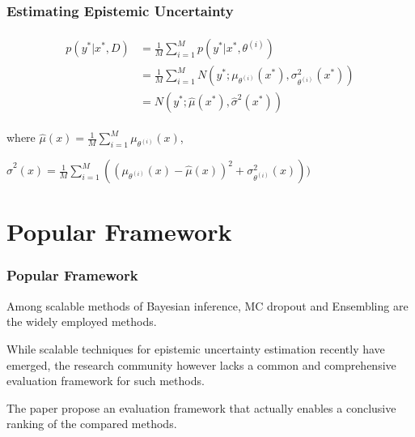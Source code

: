 \documentclass{beamer}
\begin{document}
\begin{frame}
\frametitle{Estimating Epistemic Uncertainty}

\begin{align}
\begin{split}
 p(y^*|x^*, D) &= \frac{1}{M} \sum_{i=1}^{M} p(y^*| x^*, \theta^{(i)})
\\
  &= \frac{1}{M} \sum_{i=1}^{M} N(y^*; \mu_{\theta^{(i)}} (x^*), \sigma_{\theta^{(i)}}^2 (x^*)) 
\\
  &= N(y^*; \hat{\mu}(x^*), \hat{\sigma}^2 (x^*))
\end{split}
\end{align}

where
$\hat{\mu}(x) = \frac{1}{M} \sum_{i=1}^{M} \mu_{\theta^{(i)}} (x) $, 

\vspace{0.3cm}

$\hat{\sigma}^2 (x) = \frac{1}{M} \sum_{i=1}^{M} ((\mu_{\theta^{(i)}} (x) -  \hat{\mu}(x) )^2 + \sigma_{\theta^{(i)}}^2 (x)) )$

\end{frame}



\section{Popular Framework}
\begin{frame}
\frametitle{Popular Framework}

\hspace{0.3cm} Among scalable methods of Bayesian inference, MC dropout and Ensembling are the widely employed methods.

\vspace{0.3cm}

\hspace{0.3cm} While scalable techniques for epistemic uncertainty estimation recently have emerged, the research community however lacks a common and comprehensive evaluation framework for such methods.

\vspace{0.3cm}

\hspace{0.3cm}The paper propose an evaluation framework that actually enables a conclusive ranking of the compared methods.


\end{frame}
\end{document}

